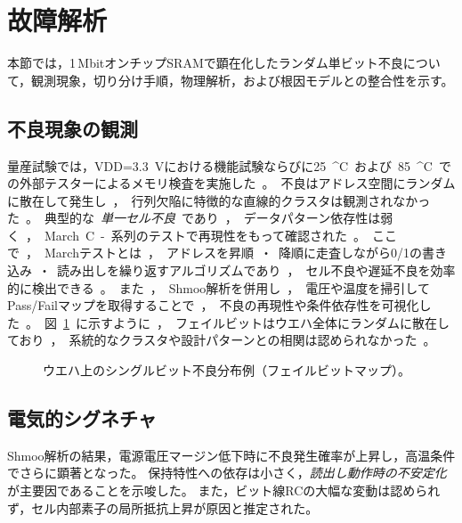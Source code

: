 \documentclass[conference]{IEEEtran}
\begin{document}
\section{故障解析}
本節では，1\,MbitオンチップSRAMで顕在化したランダム単ビット不良について，観測現象，切り分け手順，物理解析，および根因モデルとの整合性を示す。

\subsection{不良現象の観測}
量産試験では，VDD=\SI{3.3}{V}における機能試験ならびに\SI{25}{^\circ C}および\SI{85}{^\circ C}での外部テスターによるメモリ検査を実施した。  
不良はアドレス空間にランダムに散在して発生し，行列欠陥に特徴的な直線的クラスタは観測されなかった。  
典型的な\emph{単一セル不良}であり，データパターン依存性は弱く，March C-系列のテストで再現性をもって確認された。  

ここで，Marchテストとは，アドレスを昇順・降順に走査しながら0/1の書き込み・読み出しを繰り返すアルゴリズムであり，セル不良や遅延不良を効率的に検出できる。  
また，Shmoo解析を併用し，電圧や温度を掃引してPass/Failマップを取得することで，不良の再現性や条件依存性を可視化した。
図\ref{fig:failmap}に示すように，フェイルビットはウエハ全体にランダムに散在しており，
系統的なクラスタや設計パターンとの相関は認められなかった。

\begin{figure}[!t]
\centering
{}
\caption{ウエハ上のシングルビット不良分布例（フェイルビットマップ）。}
\label{fig:failmap}
\end{figure}

\subsection{電気的シグネチャ}
Shmoo解析の結果，電源電圧マージン低下時に不良発生確率が上昇し，高温条件でさらに顕著となった。  
保持特性への依存は小さく，\emph{読出し動作時の不安定化}が主要因であることを示唆した。  
また，ビット線RCの大幅な変動は認められず，セル内部素子の局所抵抗上昇が原因と推定された。
\end{document}
